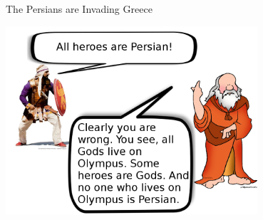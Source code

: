 %
%
%


\begin{frame}{The Persians are Invading Greece}
\begin{center}
  \includegraphics[height=7cm]{../img/persian_invaders.png}
\end{center}
\end{frame}

